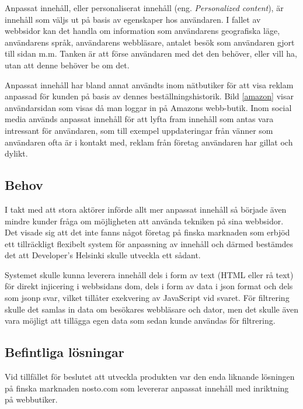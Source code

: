 Anpassat innehåll, eller personaliserat innehåll (eng. \textit{Personalized content}), är innehåll som väljs ut på basis av egenskaper hos användaren. I fallet av webbsidor kan det handla om information som användarens geografiska läge, användarens språk, användarens webbläsare, antalet besök som användaren gjort till sidan m.m. Tanken är att förse användaren med det den behöver, eller vill ha, utan att denne behöver be om det. \citep{cotacm43}

Anpassat innehåll har bland annat användts inom nätbutiker för att visa reklam anpassad för kunden på basis av dennes beställningshistorik. Bild \ref{amazon} visar användarsidan som visas då man loggar in på Amazons webb-butik. Inom social media används anpassat innehåll för att lyfta fram innehåll som antas vara intressant för användaren, som till exempel uppdateringar från vänner som användaren ofta är i kontakt med, reklam från företag användaren har gillat och dylikt. \citep{socialmedia}


\subsection{Behov}

I takt med att stora aktörer införde allt mer anpassat innehåll så började även mindre kunder fråga om möjligheten att använda tekniken på sina webbsidor. Det visade sig att det inte fanns något företag på finska marknaden som erbjöd ett tillräckligt flexibelt system för anpassning av innehåll och därmed bestämdes det att Developer's Helsinki skulle utveckla ett sådant.

Systemet skulle kunna leverera innehåll dels i form av text (HTML eller rå text) för direkt injicering i webbsidans \gls{dom}, dels i form av data i \gls{json} format och dels som \gls{jsonp} svar, vilket tillåter exekvering av JavaScript vid svaret. För filtrering skulle det samlas in data om besökares webbläsare och dator, men det skulle även vara möjligt att tillägga egen data som sedan kunde användas för filtrering.

\subsection{Befintliga lösningar}

Vid tillfället för beslutet att utveckla produkten var den enda liknande lösningen på finska marknaden nosto.com som levererar anpassat innehåll med inriktning på webbutiker.\citep{nosto}


